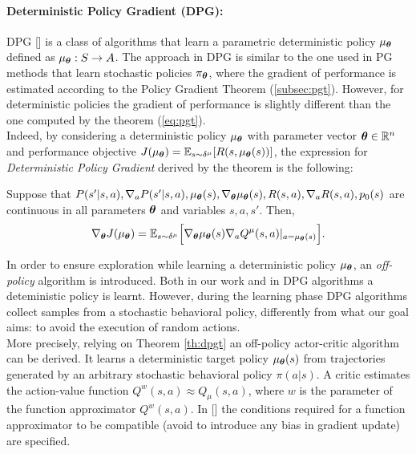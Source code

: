 \paragraph{Deterministic Policy Gradient (DPG):} \label{subsec:dpg}
\ac{DPG} [\cite{article}] is a class of algorithms that learn a parametric deterministic policy $\mu_{\boldsymbol{\theta}}$ defined as $\mu_{\boldsymbol{\theta}}: S \to A$. The approach in \ac{DPG} is similar to the one used in \ac{PG} methods that learn stochastic policies $\pi_{\boldsymbol{\theta}}$, where the gradient of performance is estimated according to the Policy Gradient Theorem (\ref{subsec:pgt}). However, for deterministic policies the gradient of performance is slightly different than the one computed by the theorem (\ref{eq:pgt}).\\
\newline
Indeed, by considering a deterministic policy $\mu_{\boldsymbol{\theta}}$ with parameter vector $\boldsymbol{\theta} \in \mathbb{R}^n$ and performance objective $J(\mu_{\boldsymbol{\theta}}) = \mathbb{E}_{s \sim \delta^{\mu}}[R(s, \mu_{\boldsymbol{\theta}}(s))]$, the expression for \emph{Deterministic Policy Gradient} derived by the theorem is the following:
\begin{theorem} \label{th:dpgt}
	Suppose that $P(s'|s,a), \nabla_aP(s'|s,a), \mu_{\boldsymbol{\theta}}(s), \nabla_{\boldsymbol{\theta}} \mu_{\boldsymbol{\theta}}(s), R(s,a), \nabla_a R(s,a), p_0(s)$ are continuous in all parameters $\boldsymbol{\theta}$ and variables $s, a, s'$. Then, 
	\begin{align}
	\nabla_{\boldsymbol{\theta}}J(\mu_{\boldsymbol{\theta}}) = \mathbb{E}_{s \sim \delta^{\mu}} \Big[\nabla_{\boldsymbol{\theta}} \mu_{\boldsymbol{\theta}} (s) \nabla_a Q^{\mu}(s,a)|_{a = \mu_{\boldsymbol{\theta}} (s)}\Big].
	\end{align}
\end{theorem}
\noindent In order to ensure exploration while learning a deterministic policy $\mu_{\boldsymbol{\theta}}$, an \emph{off-policy} algorithm is introduced. %
Both in our work and in \ac{DPG} algorithms a deteministic policy is learnt. However, during the learning phase \ac{DPG} algorithms collect samples from a stochastic behavioral policy, differently from what our goal aims: to avoid the execution of random actions.\\
\newline
More precisely, relying on Theorem \ref{th:dpgt} an off-policy actor-critic algorithm can be derived. It learns a deterministic target policy $\mu_{\boldsymbol{\theta}}(s)$ from trajectories generated by an arbitrary stochastic behavioral policy $\pi(a|s)$. A critic estimates the action-value function $Q^w(s,a) \approx Q_{\mu}(s,a)$, where $w$ is the parameter of the function approximator $Q^w(s,a)$. In [\cite{article}] the conditions required for a function approximator to be compatible (\ie avoid to introduce any bias in gradient update) are specified.\\
